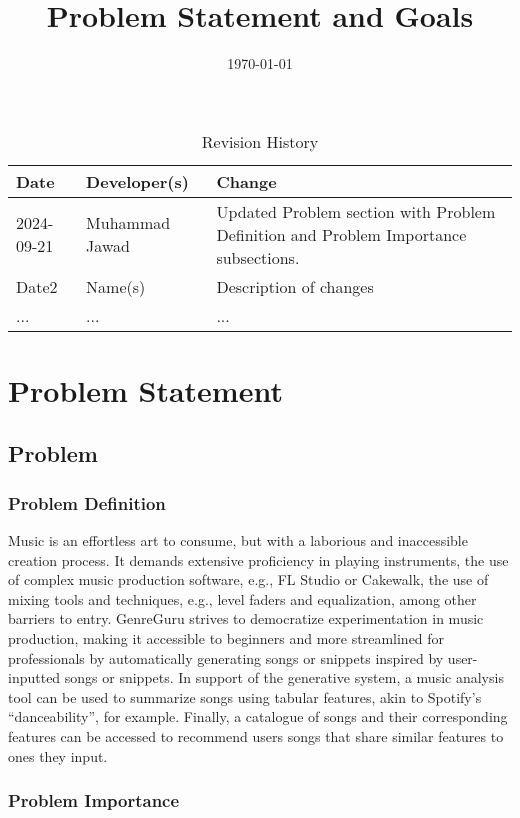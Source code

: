 \documentclass{article}
\title{Problem Statement and Goals\\\progname}
\author{\authname}
\date{\today}
\begin{document}
\maketitle

\begin{table}[hp]
\caption{Revision History} \label{TblRevisionHistory}
\begin{tabularx}{\textwidth}{llX}
\toprule
\textbf{Date} & \textbf{Developer(s)} & \textbf{Change}\\
\midrule
2024-09-21 & Muhammad Jawad & Updated Problem section with Problem Definition and Problem Importance subsections.\\
Date2 & Name(s) & Description of changes\\
... & ... & ...\\
\bottomrule
\end{tabularx}
\end{table}

\section{Problem Statement}

\subsection{Problem}

\subsubsection{Problem Definition}

Music is an effortless art to consume, but with a laborious and inaccessible creation process. It demands extensive proficiency in playing instruments, the use of complex music production software, e.g., FL Studio or Cakewalk, the use of mixing tools and techniques, e.g., level faders and equalization, among other barriers to entry. GenreGuru strives to democratize experimentation in music production, making it accessible to beginners and more streamlined for professionals by automatically generating songs or snippets inspired by user-inputted songs or snippets. In support of the generative system, a music analysis tool can be used to summarize songs using tabular features, akin to Spotify's ``danceability'', for example. Finally, a catalogue of songs and their corresponding features can be accessed to recommend users songs that share similar features to ones they input.

\subsubsection{Problem Importance}
\end{document}
